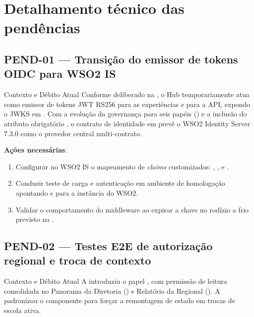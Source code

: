 \section{Detalhamento técnico das pendências}

\subsection{PEND-01 — Transição do emissor de tokens OIDC para WSO2 IS}

\begin{especificacao}{Contexto e Débito Atual}
Conforme deliberado na , o Hub temporariamente atua como emissor de
tokens JWT RS256 para as experiências e para a API, expondo o JWKS em
. Com a evolução da governança para seis papéis
() e a inclusão do atributo obrigatório , o contrato de
identidade em  prevê o WSO2 Identity Server 7.3.0 como
o provedor central multi-contrato.
\end{especificacao}

\textbf{Ações necessárias}:
\begin{enumerate}
  \item Configurar no WSO2 IS o mapeamento de \emph{claims} customizados:
    , ,  e .
  \item Conduzir teste de carga e autenticação em ambiente de homologação apontando
     e  para a instância do WSO2.
  \item Validar o comportamento do middleware ao expirar a chave no rodízio a frio
    previsto na .
\end{enumerate}

\subsection{PEND-02 — Testes E2E de autorização regional e troca de contexto}

\begin{especificacao}{Contexto e Débito Atual}
A  introduziu o papel , com permissão de leitura
consolidada no Panorama da Diretoria () e Relatório da Regional
(). A  padronizou o componente  para
forçar a remontagem de estado em trocas de escola ativa.
\end{especificacao}

